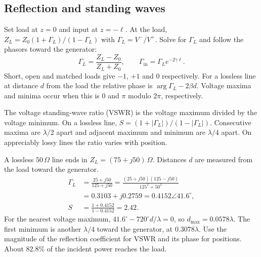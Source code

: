\documentclass[12pt,a4paper]{article}
\begin{document}
\subsection{Reflection and standing waves}
Set load at $z=0$ and input at $z=-\ell$. At the load, $Z_L=Z_0(1+\Gamma_L)/(1-\Gamma_L)$ with $\Gamma_L=V^-/V^+$. Solve for $\Gamma_L$ and follow the phasors toward the generator:
\[
 \Gamma_L=\frac{Z_L-Z_0}{Z_L+Z_0},\qquad
 \Gamma_{\mathrm{in}}=\Gamma_L e^{-2\gamma\ell}.
\]
Short, open and matched loads give $-1$, $+1$ and 0 respectively. For a lossless line at distance $d$ from the load the relative phase is $\arg\Gamma_L-2\beta d$. Voltage maxima and minima occur when this is $0$ and $\pi$ modulo $2\pi$, respectively.
\begin{tcolorbox}[defbox,title={Voltage standing-wave ratio}]
The voltage standing-wave ratio (VSWR) is the voltage maximum divided by the voltage minimum. On a lossless line, $S=(1+|\Gamma_L|)/(1-|\Gamma_L|)$. Consecutive maxima are $\lambda/2$ apart and adjacent maximum and minimum are $\lambda/4$ apart. On appreciably lossy lines the ratio varies with position.
\end{tcolorbox}
\begin{tcolorbox}[examplebox,title={Complex load, VSWR and standing-wave positions}]
A lossless $50\,\Omega$ line ends in $Z_L=(75+j50)\,\Omega$. Distances $d$ are measured from the load toward the generator.
\[
\begin{aligned}
\Gamma_L&=\frac{25+j50}{125+j50}
  =\frac{(25+j50)(125-j50)}{125^2+50^2}\\
  &=0.3103+j0.2759=0.4152\angle41.6^\circ,\\
S&=\frac{1+0.4152}{1-0.4152}=2.42.
\end{aligned}
\]
For the nearest voltage maximum, $41.6^\circ-720^\circ d/\lambda=0$, so $d_{\max}=0.0578\lambda$. The first minimum is another $\lambda/4$ toward the generator, at $0.3078\lambda$. Use the magnitude of the reflection coefficient for VSWR and its phase for positions. About $82.8\%$ of the incident power reaches the load.
\end{tcolorbox}
\end{document}
